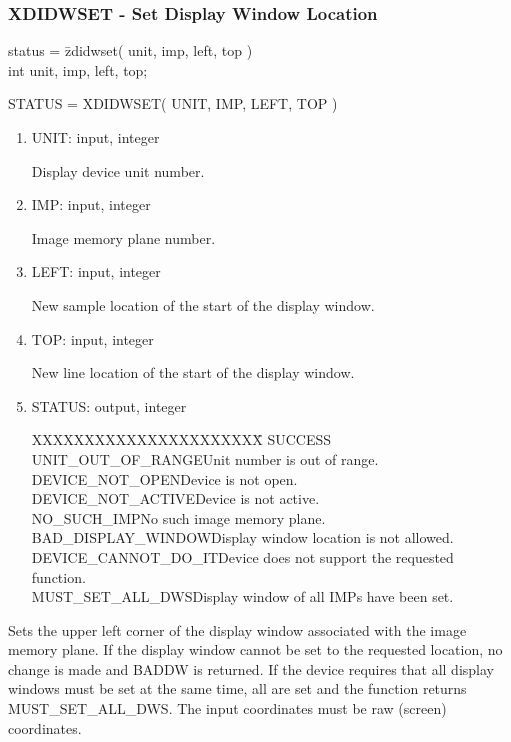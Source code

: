 \subsubsection{XDIDWSET - Set Display Window Location}
\begin{tabbing}
status = \=zdidwset( unit, imp, left, top )\\
\>int  unit, imp, left, top;\\
\end{tabbing}
STATUS = XDIDWSET( UNIT, IMP, LEFT, TOP )
\begin{enumerate}
\item UNIT:  input, integer

Display device unit number.
\item IMP:  input, integer

Image memory plane number.
\item LEFT:  input, integer

New sample location of the start of the display window.
\item TOP:  input, integer

New line location of the start of the display window.
\item STATUS:  output, integer
\begin{tabbing}
XXXXXXXXXXXXXXXXXXXXXX\=\kill
SUCCESS\\
UNIT\_OUT\_OF\_RANGE\>Unit number is out of range.\\
DEVICE\_NOT\_OPEN\>Device is not open.\\
DEVICE\_NOT\_ACTIVE\>Device is not active.\\
NO\_SUCH\_IMP\>No such image memory plane.\\
BAD\_DISPLAY\_WINDOW\>Display window location is not allowed.\\
DEVICE\_CANNOT\_DO\_IT\>Device does not support the requested function.\\
MUST\_SET\_ALL\_DWS\>Display window of all IMPs have been set.\\
\end{tabbing}
\end{enumerate}
Sets the upper left corner of the display window associated with the
image memory plane.  If the display window cannot be set to the
requested location, no change is made and BADDW is returned.  If the
device requires that all display windows must be set at the same
time, all are set and the function returns MUST\_SET\_ALL\_DWS.  The
input coordinates must be raw (screen) coordinates.
\newpage
